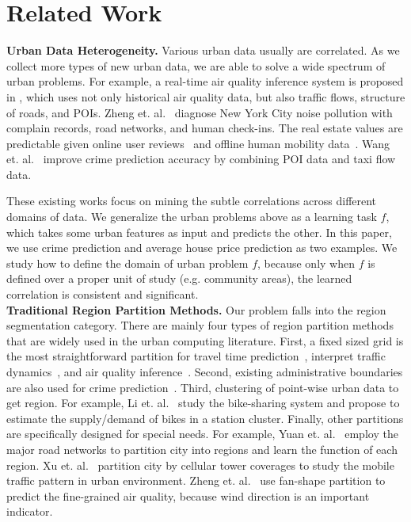 \section{Related Work}
\label{sec:related-work}


\textbf{Urban Data Heterogeneity.} Various urban data usually are correlated. As we collect more types of new urban data, we are able to solve a wide spectrum of urban problems. For example, a real-time air quality inference system is proposed in \cite{zheng2013u}, which uses not only historical air quality data, but also traffic flows, structure of roads, and POIs. Zheng et. al.~\cite{zheng2014diagnosing} diagnose New York City noise pollution with complain records, road networks, and human check-ins. The real estate values are predictable given online user reviews~\cite{fu2014sparse} and offline human mobility data~\cite{wang:region}. Wang et. al.~\cite{wang2016crime, wang2017non} improve crime prediction accuracy by combining POI data and taxi flow data.

These existing works focus on mining the subtle correlations across different domains of data. We generalize the urban problems above as a learning task $f$, which takes some urban features as input and predicts the other. In this paper, we use crime prediction and average house price prediction as two examples. We study how to define the domain of urban problem $f$, because only when $f$ is defined over a proper unit of study (e.g. community areas), the learned correlation is consistent and significant.\\


\noindent\textbf{Traditional Region Partition Methods.} Our problem falls into the region segmentation category. There are mainly four types of region partition methods that are widely used in the urban computing literature. First, a fixed sized grid is the most straightforward partition for travel time prediction~\cite{wang2016simple}, interpret traffic dynamics~\cite{wu2016interpreting}, and air quality inference~\cite{zheng2013u}. Second, existing administrative boundaries are also used for crime prediction~\cite{wang2016crime}. Third, clustering of point-wise urban data to get region. For example, Li et. al.~\cite{li2015traffic} study the bike-sharing system and propose to estimate the supply/demand of bikes in a station cluster. Finally, other partitions are specifically designed for special needs. For example, Yuan et. al.~\cite{yuan2012discovering} employ the major road networks to partition city into regions and learn the function of each region. Xu et. al.~\cite{xu2017understanding} partition city by cellular tower coverages to study the mobile traffic pattern in urban environment. Zheng et. al.~\cite{zheng2015forecasting} use fan-shape partition to predict the fine-grained air quality, because wind direction is an important indicator.


